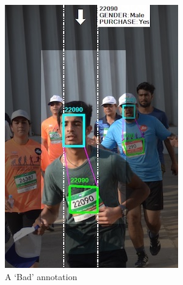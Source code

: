 \begin{figure}[p]
  \hspace{\fill}
  \begin{subfigure}[b]{0.30\textwidth}
    \includegraphics[width=\textwidth]{images/dataset/argus/quality_tagging_bad_polygons}
    \caption{A `Bad' annotation}
    \label{fig:dataset:argus:qualituy_tiers:bad_polygons}
  \end{subfigure}
  \hspace{\fill}
  \begin{subfigure}[b]{0.30\textwidth}

\end{subfigure}
\end{figure}
